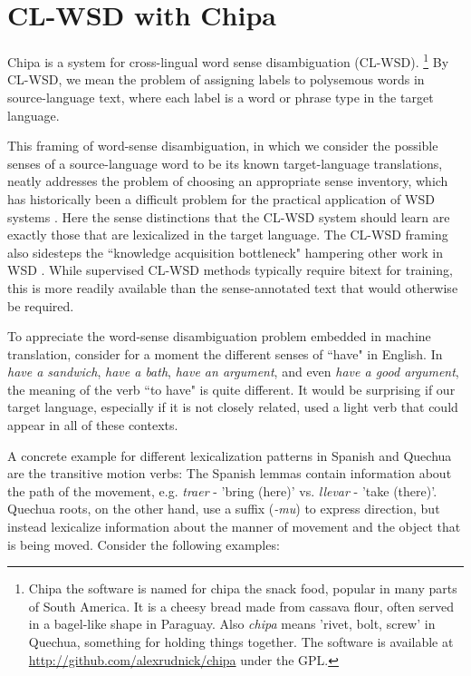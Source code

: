 \documentclass[10pt, a4paper]{article}
\begin{document}
\section{CL-WSD with Chipa}
Chipa is a system for cross-lingual word sense disambiguation (CL-WSD).
\footnote{Chipa the software is named for chipa the snack food, popular in many
  parts of South America. It is a cheesy bread made from cassava flour, often
  served in a bagel-like shape in Paraguay.  Also \emph{chipa} means 'rivet,
  bolt, screw' in Quechua, something for holding things together.  The software
is available at \\ \url{http://github.com/alexrudnick/chipa} under the GPL.} By
CL-WSD, we mean the problem of assigning labels to polysemous words in
source-language text, where each label is a word or phrase type in the target
language.

This framing of word-sense disambiguation, in which we consider the possible
senses of a source-language word to be its known target-language translations,
neatly addresses the problem of choosing an appropriate sense inventory, which
has historically been a difficult problem for the practical application of WSD
systems \cite{agirre2006word}.
Here the sense distinctions that the CL-WSD system should learn are exactly
those that are lexicalized in the target language.
The CL-WSD framing also sidesteps the ``knowledge acquisition bottleneck"
hampering other work in WSD \cite{lefever-hoste-decock:2011:ACL-HLT2011}.
While supervised CL-WSD methods typically require bitext for training, this is
more readily available than the sense-annotated text that would otherwise be
required.

To appreciate the word-sense disambiguation problem embedded in machine
translation, consider for a moment the different senses of ``have" in
English. In \emph{have a sandwich}, \emph{have a bath}, \emph{have an
argument}, and even \emph{have a good argument}, the meaning of the verb ``to
have" is quite different. It would be surprising if our target language,
especially if it is not closely related, used a light verb that could appear in
all of these contexts.

A concrete example for different lexicalization patterns in Spanish and Quechua
are the transitive motion verbs: The Spanish lemmas contain information about
the path of the movement, e.g. {\em traer} - 'bring (here)' vs. {\em llevar} -
'take (there)'. Quechua roots, on the other hand, use a suffix ({\em -mu}) to
express direction, but instead lexicalize information about the manner of
movement and the object that is being moved. Consider the following examples:
\end{document}
